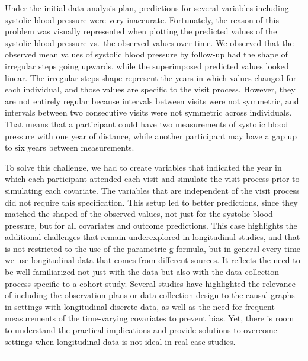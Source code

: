 \documentclass[
]{book}
\begin{document}
Under the initial data analysis plan, predictions for several variables including systolic blood pressure were very inaccurate. Fortunately, the reason of this problem was visually represented when plotting the predicted values of the systolic blood pressure vs.~the observed values over time. We observed that the observed mean values of systolic blood pressure by follow-up had the shape of irregular steps going upwards, while the superimposed predicted values looked linear. The irregular steps shape represent the years in which values changed for each individual, and those values are specific to the visit process. However, they are not entirely regular because intervals between visits were not symmetric, and intervals between two consecutive visits were not symmetric across individuals. That means that a participant could have two measurements of systolic blood pressure with one year of distance, while another participant may have a gap up to six years between measurements.

To solve this challenge, we had to create variables that indicated the year in which each participant attended each visit and simulate the visit process prior to simulating each covariate. The variables that are independent of the visit process did not require this specification. This setup led to better predictions, since they matched the shaped of the observed values, not just for the systolic blood pressure, but for all covariates and outcome predictions. This case highlights the additional challenges that remain underexplored in longitudinal studies, and that is not restricted to the use of the parametric g-formula, but in general every time we use longitudinal data that comes from different sources. It reflects the need to be well familiarized not just with the data but also with the data collection process specific to a cohort study. Several studies have highlighted the relevance of including the observation plans or data collection design to the causal graphs in settings with longitudinal discrete data\autocite{hernan2009,zhang2011}, as well as the need for frequent measurements of the time-varying covariates to prevent bias\autocite{young2019}. Yet, there is room to understand the practical implications and provide solutions to overcome settings when longitudinal data is not ideal in real-case studies.

\begin{center}\rule{0.5\linewidth}{0.5pt}\end{center}
\end{document}
